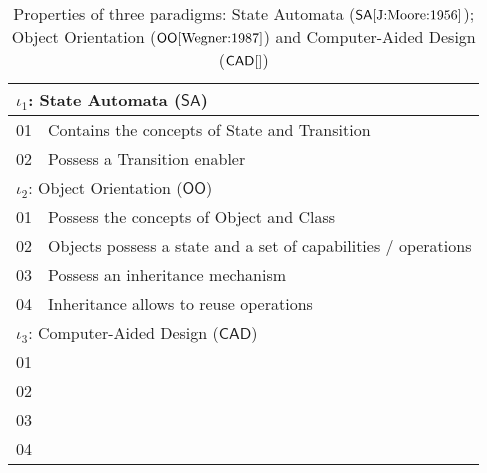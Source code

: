 \begin{table}[t]
   \begin{center}
      \begin{tabular}[t]{c l}
         \hline
         \multicolumn{2}{l}{$\iota_1$: State Automata ($\mathsf{SA}$)}\\
         \hline
         01 & Contains the concepts of State and Transition\\
         02 & Possess a Transition enabler\\
         \hline\hline
         \multicolumn{2}{l}{$\iota_2$: Object Orientation ($\mathsf{OO}$)}\\
         \hline
         01 & Possess the concepts of Object and Class\\
         02 & Objects possess a state and a set of capabilities / operations \\
         03 & Possess an inheritance mechanism\\
         04 & Inheritance allows to reuse operations\\
         \hline\hline
         \multicolumn{2}{l}{$\iota_3$: Computer-Aided Design ($\mathsf{CAD}$)}\\
         \hline
         01 & \\
         02 & \\
         03 & \\
         04 & \\
         \hline
      \end{tabular}
   \end{center}
   \label{tab:Properties}
   \caption{Properties of three paradigms: State Automata ($\mathsf{SA} 
\cite{J:Moore:1956}$); Object Orientation ($\mathsf{OO} \cite{Wegner:1987}$) 
and Computer-Aided Design ($\mathsf{CAD} \cite{}$)}
\end{table}
